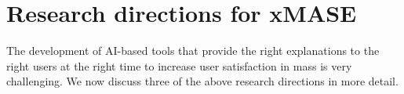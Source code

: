 \documentclass[letterpaper]{article} %
\newcommand{\tim}[1]{\todo[inline, color=yellow!20]{#1}}
\begin{document}
{{{{{{{{{%








\section{Research directions for \ac{xMASE}}

The development of AI-based tools that provide the right explanations to the right users at the
right time to increase user satisfaction in \acp{mas} is very challenging. We now discuss three of the above research directions in more detail.


}}}}}}}}}
\end{document}
